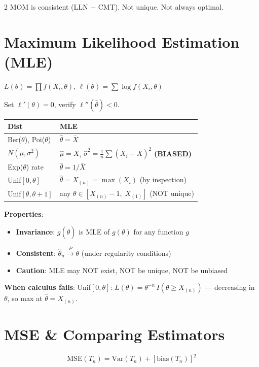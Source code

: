 \documentclass[8pt]{extarticle}
\begin{document}
\begin{multicols}{2}
MOM is consistent (LLN + CMT). Not unique. Not always optimal.

\section{Maximum Likelihood Estimation (MLE)}

$L(\theta) = \prod f(X_i,\theta)$, \qquad $\ell(\theta) = \sum\log f(X_i,\theta)$

Set $\ell'(\theta) = 0$, verify $\ell''(\hat\theta) < 0$.

\begin{tabular}{@{}ll@{}}
\toprule
\textbf{Dist} & \textbf{MLE} \\
\midrule
Ber($\theta$), Poi($\theta$) & $\hat\theta = \bar X$ \\
$N(\mu,\sigma^2)$ & $\hat\mu = \bar X$, \; $\hat\sigma^2 = \frac{1}{n}\sum(X_i{-}\bar X)^2$ \textbf{(BIASED)} \\
Exp($\theta$) rate & $\hat\theta = 1/\bar X$ \\
Unif$[0,\theta]$ & $\hat\theta = X_{(n)} = \max(X_i)$ (by inspection) \\
Unif$[\theta,\theta{+}1]$ & any $\theta \in [X_{(n)}{-}1,\; X_{(1)}]$ (NOT unique) \\
\bottomrule
\end{tabular}

\textbf{Properties}:
\begin{itemize}
\item \textbf{Invariance}: $g(\hat\theta)$ is MLE of $g(\theta)$ for any function $g$
\item \textbf{Consistent}: $\hat\theta_n \xrightarrow{P} \theta$ (under regularity conditions)
\item \textbf{Caution}: MLE may NOT exist, NOT be unique, NOT be unbiased
\end{itemize}

\textbf{When calculus fails}: Unif$[0,\theta]$: $L(\theta) = \theta^{-n}\,I(\theta \ge X_{(n)})$ --- decreasing in $\theta$, so max at $\hat\theta = X_{(n)}$.

\section{MSE \& Comparing Estimators}

$$\text{MSE}(T_n) = \text{Var}(T_n) + [\text{bias}(T_n)]^2$$


\end{multicols}
\end{document}
